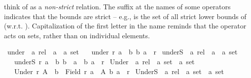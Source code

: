 \begin{isabellebody}
\begin{isamarkuptext}
  think of  as a \emph{non-strict} relation. The suffix  at the names of
  some operators indicates that the bounds are strict -- e.g.,  is
  the set of all strict lower bounds of  (w.r.t. ). Capitalization of
  the first letter in the name reminds that the operator acts on sets, rather
  than on individual elements.%
\end{isamarkuptext}\isamarkuptrue%
\isamarkupfalse%
\ under\ {\isacharcolon}{\kern0pt}{\isacharcolon}{\kern0pt}\ {\isachardoublequoteopen}{\isacharprime}{\kern0pt}a\ rel\ {\isasymRightarrow}\ {\isacharprime}{\kern0pt}a\ {\isasymRightarrow}\ {\isacharprime}{\kern0pt}a\ set{\isachardoublequoteclose}\isanewline
\ \ \ {\isachardoublequoteopen}under\ r\ a\ {\isasymequiv}\ {\isacharbraceleft}{\kern0pt}b{\isachardot}{\kern0pt}\ {\isacharparenleft}{\kern0pt}b{\isacharcomma}{\kern0pt}\ a{\isacharparenright}{\kern0pt}\ {\isasymin}\ r{\isacharbraceright}{\kern0pt}{\isachardoublequoteclose}\isanewline
\isanewline
{}\isamarkupfalse%
\ underS\ {\isacharcolon}{\kern0pt}{\isacharcolon}{\kern0pt}\ {\isachardoublequoteopen}{\isacharprime}{\kern0pt}a\ rel\ {\isasymRightarrow}\ {\isacharprime}{\kern0pt}a\ {\isasymRightarrow}\ {\isacharprime}{\kern0pt}a\ set{\isachardoublequoteclose}\isanewline
\ \ \ {\isachardoublequoteopen}underS\ r\ a\ {\isasymequiv}\ {\isacharbraceleft}{\kern0pt}b{\isachardot}{\kern0pt}\ b\ {\isasymnoteq}\ a\ {\isasymand}\ {\isacharparenleft}{\kern0pt}b{\isacharcomma}{\kern0pt}\ a{\isacharparenright}{\kern0pt}\ {\isasymin}\ r{\isacharbraceright}{\kern0pt}{\isachardoublequoteclose}\isanewline
\isanewline
{}\isamarkupfalse%
\ Under\ {\isacharcolon}{\kern0pt}{\isacharcolon}{\kern0pt}\ {\isachardoublequoteopen}{\isacharprime}{\kern0pt}a\ rel\ {\isasymRightarrow}\ {\isacharprime}{\kern0pt}a\ set\ {\isasymRightarrow}\ {\isacharprime}{\kern0pt}a\ set{\isachardoublequoteclose}\isanewline
\ \ \ {\isachardoublequoteopen}Under\ r\ A\ {\isasymequiv}\ {\isacharbraceleft}{\kern0pt}b\ {\isasymin}\ Field\ r{\isachardot}{\kern0pt}\ {\isasymforall}a\ {\isasymin}\ A{\isachardot}{\kern0pt}\ {\isacharparenleft}{\kern0pt}b{\isacharcomma}{\kern0pt}\ a{\isacharparenright}{\kern0pt}\ {\isasymin}\ r{\isacharbraceright}{\kern0pt}{\isachardoublequoteclose}\isanewline
\isanewline
{}\isamarkupfalse%
\ UnderS\ {\isacharcolon}{\kern0pt}{\isacharcolon}{\kern0pt}\ {\isachardoublequoteopen}{\isacharprime}{\kern0pt}a\ rel\ {\isasymRightarrow}\ {\isacharprime}{\kern0pt}a\ set\ {\isasymRightarrow}\ {\isacharprime}{\kern0pt}a\ set{\isachardoublequoteclose}\isanewline

\end{isabellebody}
